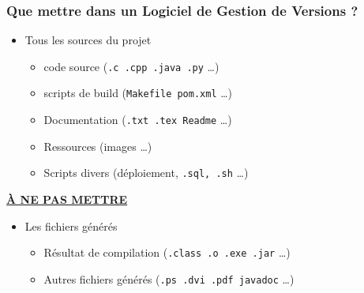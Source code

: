 \documentclass[table,tikz,12pt,svgnames]{beamer}
\begin{document}
\begin{frame}
	\frametitle{Que mettre dans un Logiciel de Gestion de Versions ?}
	\vspace{-2em}
	\begin{block}{}%
    \begin{adjustwidth}{-0.5cm}{}
		\begin{itemize}
			\item Tous les sources du projet
			\begin{itemize}
				\item code source (\texttt{.c .cpp .java .py} \dots)
				\item scripts de build (\texttt{Makefile pom.xml} \ldots)
				\item Documentation (\texttt{.txt .tex Readme} \ldots)
				\item Ressources (images \ldots)
				\item Scripts divers (déploiement, \texttt{.sql, .sh} \ldots)
			\end{itemize}
		\end{itemize}
	\end{adjustwidth}	
	\end{block}
	\PAUSE
	\begin{block}{\color{red} \underline{\textbf{À NE PAS METTRE}}}
    \begin{adjustwidth}{-0.5cm}{}
	\begin{itemize}
		\item Les fichiers générés
		\begin{itemize}
			\item Résultat de compilation (\texttt{.class .o .exe .jar} \ldots)
			\item Autres fichiers générés (\texttt{.ps .dvi .pdf javadoc} \ldots)
		\end{itemize}
	\end{itemize}
	\end{adjustwidth}
	\end{block}
\end{frame}
\end{document}

